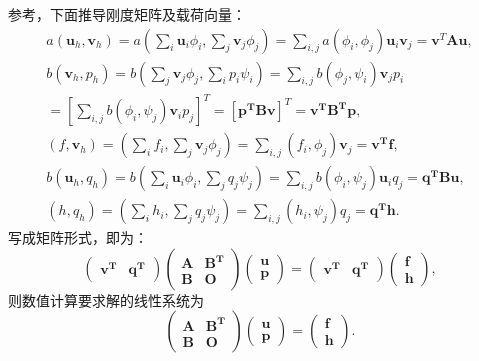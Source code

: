 \documentclass{ctexart}
\begin{document}
参考\citet{FEM程序理论}，下面推导刚度矩阵及载荷向量：
\begin{gather*}
    a(\mathbf{u}_h,\mathbf{v}_h)=a(\sum_{i}\mathbf{u} _i \phi_i, \sum_j\mathbf{v}_j\phi_j ) = \sum_{i,j}a(\phi_i,\phi_j)
    \mathbf{u}_i\mathbf{v}_j=\mathbf{v}^T\mathbf{Au},\\
    b(\mathbf{v}_h,p_h)= b(\sum_{j}\mathbf{v} _j \phi_j, \sum_ip_i\psi_i ) = \sum_{i,j}b(\phi_j,\psi_i)\mathbf{v}_jp_i\\
=[\sum_{i,j}b(\phi_i,\psi_j)\mathbf{v}_ip_j]^T
=[\mathbf{p^TBv}]^T=\mathbf{v^TB^Tp},\\
(f,\mathbf{v}_h)=(\sum_if_i,\sum_j\mathbf{v}_j\phi_j)
=\sum_{i,j}(f_i,\phi_j)\mathbf{v}_j
=\mathbf{v^Tf},\\
b(\mathbf{u}_h,q_h)= b(\sum_{i}\mathbf{u} _i \phi_i, \sum_jq_j\psi_j ) 
= \sum_{i,j}b(\phi_i,\psi_j)\mathbf{u}_iq_j
=\mathbf{q^TBu},\\
(h,q_h)=(\sum_ih_i,\sum_jq_j\psi_j)
=\sum_{i,j}(h_i,\psi_j)q_j
=\mathbf{q^Th}.
\end{gather*}
写成矩阵形式，即为：
$$
\begin{pmatrix}
    \mathbf{v^T}   
    & \mathbf{q^T} 
    \end{pmatrix}
    \begin{pmatrix}
      \mathbf{A} &  \mathbf{B^T} \\
      \mathbf{B} & \mathbf{O} 
    \end{pmatrix}
    \begin{pmatrix}
     \mathbf{u} \\
    \mathbf{p} 
    \end{pmatrix}=
    \begin{pmatrix}
    \mathbf{v^T}   
    & \mathbf{q^T} 
    \end{pmatrix}
    \begin{pmatrix}
     \mathbf{f}\\
    \mathbf{h } 
    \end{pmatrix},
$$
则数值计算要求解的线性系统为
\begin{equation}
    \begin{pmatrix}
        \mathbf{A} &  \mathbf{B^T} \\
        \mathbf{B} & \mathbf{O} 
      \end{pmatrix}
      \begin{pmatrix}
       \mathbf{u} \\
      \mathbf{p} 
      \end{pmatrix}=
      \begin{pmatrix}
        \mathbf{f}\\
       \mathbf{h } 
       \end{pmatrix}.   
\end{equation}
\end{document}
